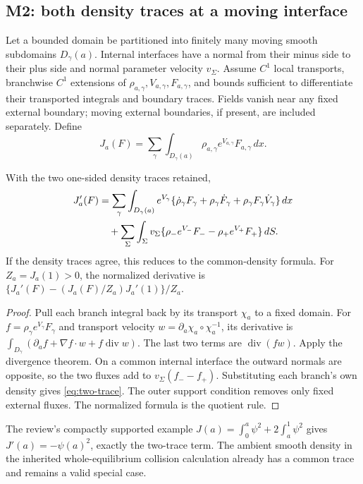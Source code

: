 \subsection{M2: both density traces at a moving interface}
Let a bounded domain be partitioned into finitely many moving smooth
subdomains $D_\gamma(a)$. Internal interfaces have a normal from their minus
side to their plus side and normal parameter velocity $v_\Sigma$. Assume
$C^1$ local transports, branchwise $C^1$ extensions of
$\rho_{a,\gamma},V_{a,\gamma},F_{a,\gamma}$, and bounds sufficient to
differentiate their transported integrals and boundary traces. Fields vanish
near any fixed external boundary; moving external boundaries, if present,
are included separately. Define
\[
 J_a(F)=\sum_\gamma\int_{D_\gamma(a)}
                \rho_{a,\gamma}e^{V_{a,\gamma}}F_{a,\gamma}\,dx.
\]
\begin{theorem}\label{thm:two-trace}
With the two one-sided density traces retained,
\begin{align}
 J_a'(F)&=\sum_\gamma\int_{D_\gamma(a)}e^{V_\gamma}
  \{\dot\rho_\gamma F_\gamma+\rho_\gamma\dot F_\gamma
                         +\rho_\gamma F_\gamma\dot V_\gamma\}\,dx\notag\\
 &\quad+\sum_\Sigma\int_\Sigma v_\Sigma
    \{\rho_-e^{V_-}F_--\rho_+e^{V_+}F_+\}\,dS.
 \label{eq:two-trace}
\end{align}
If the density traces agree, this reduces to the common-density formula.
For $Z_a=J_a(1)>0$, the normalized derivative is
$\{J_a'(F)-(J_a(F)/Z_a)J_a'(1)\}/Z_a$.
\end{theorem}
\begin{proof}
Pull each branch integral back by its transport $\chi_a$ to a fixed domain.
For $f=\rho_\gamma e^{V_\gamma}F_\gamma$ and transport velocity
$w=\partial_a\chi_a\circ\chi_a^{-1}$, its derivative is
$\int_{D_\gamma}(\partial_af+\nabla f\cdot w+f\operatorname{div}w)$.
The last two terms are $\operatorname{div}(fw)$. Apply the divergence
theorem. On a common internal interface the outward normals are opposite,
so the two fluxes add to $v_\Sigma(f_--f_+)$. Substituting each branch's
own density gives \eqref{eq:two-trace}. The outer support condition removes
only fixed external fluxes. The normalized formula is the quotient rule.
\end{proof}

The review's compactly supported example
$J(a)=\int_0^a\psi^2+2\int_a^1\psi^2$ gives
$J'(a)=-\psi(a)^2$, exactly the two-trace term. The ambient smooth density
in the inherited whole-equilibrium collision calculation already has a
common trace and remains a valid special case.

